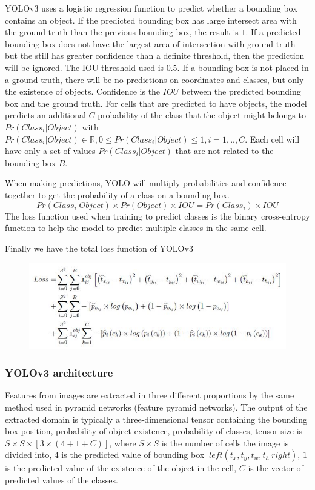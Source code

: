 \documentclass[conference]{IEEEtran}
\begin{document}
YOLOv3 \cite{redmon:2018:yolov3} uses a logistic regression function to predict whether a bounding box contains an object. If the predicted bounding box has large intersect area with the ground truth than the previous bounding box, the result is $ 1 $. If a predicted bounding box does not have the largest area of intersection with ground truth but the still has greater confidence than a definite threshold, then the prediction will be ignored. The IOU threshold used is $ 0.5 $. If a bounding box is not placed in a ground truth, there will be no predictions on coordinates and classes, but only the existence of objects.
Confidence is the $ IOU $ between the predicted bounding box and the ground truth. For cells that are predicted to have objects, the model predicts an additional $ C $ probability of the class that the object might belongs to $Pr\left(Class_i|Object\right)$ with $ Pr \left( Class_i | Object \right) \in \mathbb{R}, 0 \leq Pr \left( Class_i | Object \right) \leq 1, i = 1,..,C $. Each cell will have only a set of values $Pr \left( Class_i | Object \right) $ that are not related to the bounding box $ B $.

When making predictions, YOLO will multiply probabilities and confidence together to get the probability of a class on a bounding box.
\begin{equation}
	Pr \left( Class_i | Object \right) \times Pr(Object) \times IOU = Pr \left( Class_i \right) \times IOU
\end{equation}
The loss function used when training to predict classes is the binary cross-entropy function to help the model to predict multiple classes in the same cell.

Finally we have the total loss function of YOLOv3
\begin{figure}[ht]
	\centerline{\includegraphics[scale=0.53]{images/yolov3_loss_function.jpg}}
\end{figure}
\subsubsection{YOLOv3 architecture}
Features from images are extracted in three different proportions by the same method used in pyramid networks (feature pyramid networks). The output of the extracted domain is typically a three-dimensional tensor containing the bounding box position, probability of object existence, probability of classes, tensor size is $ S \times S \times [3 \times (4 + 1 + C)] $, where $ S \times S $ is the number of cells the image is divided into, $ 4 $ is the predicted value of bounding box $ \ left (t_x, t_y, t_w, t_h \ right) $, $ 1 $ is the predicted value of the existence of the object in the cell, $C$ is the vector of predicted values of the classes.
\end{document}
